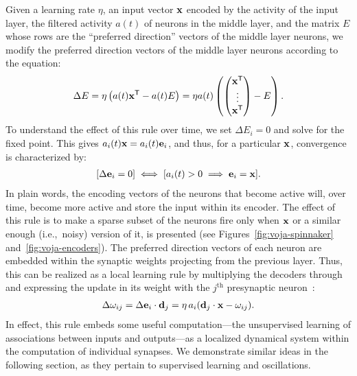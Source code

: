 Given a learning rate $\eta$, an input vector $\mathbf{x}$ encoded by the activity of the input layer, the filtered activity $a(t)$ of  neurons in the middle layer, and the matrix $E$ whose rows are the ``preferred direction'' vectors of the middle layer neurons, we modify the preferred direction vectors of the middle layer neurons according to the equation:
\begin{align} \label{voja}
    \Delta{E} = \eta \left( a(t) {\mathbf{x}}^\mathsf{T} - a(t)E \right) = \eta a(t) \left( \begin{pmatrix} {\mathbf{x}}^\mathsf{T} \\ \vdots \\ {\mathbf{x}}^\mathsf{T} \end{pmatrix} - E \right) \text{.}
\end{align}
To understand the effect of this rule over time, we set $\Delta{E_i} = 0$ and solve for the fixed point.
This gives $a_i(t) \mathbf{x} = a_i(t) \mathbf{e}_i$, and thus, for a particular $\mathbf{x}$, convergence is characterized by:
\begin{align} \label{stability}
    [\Delta{\mathbf{e}_i} = 0]  \iff  [a_i(t) > 0  \implies  \mathbf{e}_i = \mathbf{x}] \text{.}
\end{align}
In plain words, the encoding vectors of the neurons that become active will, over time, become more active and store the input within its encoder.
The effect of this rule is to make a sparse subset of the neurons fire only when $\mathbf{x}$ or a similar enough (i.e.,~noisy) version of it, is presented (see Figures~\ref{fig:voja-spinnaker} and~\ref{fig:voja-encoders}).
The preferred direction vectors of each neuron are embedded within the synaptic weights projecting from the previous layer.
Thus, this can be realized as a local learning rule by multiplying the decoders through and expressing the update in its weight with the $j^\text{th}$ presynaptic neuron~\citep{knight2016}:
\begin{align}
  \label{eq:voja-weights}
  \Delta \omega_{ij} = \Delta \mathbf{e}_i \cdot \mathbf{d}_j = \eta \, a_i (\mathbf{d}_j \cdot \mathbf{x} - \omega_{ij}) \text{.}
\end{align}
In effect, this rule embeds some useful computation---the unsupervised learning of associations between inputs and outputs---as a localized dynamical system within the computation of individual synapses.
We demonstrate similar ideas in the following section, as they pertain to supervised learning and oscillations.

